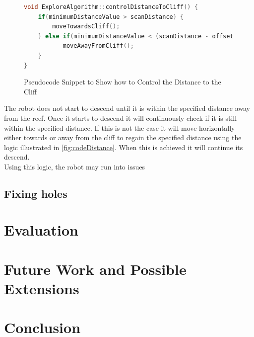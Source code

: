 \documentclass[twoside, 12pt]{article}
\begin{document}
\begin{figure}
\vspace{12pt}
\begin{lstlisting}[language=C++]
void ExploreAlgorithm::controlDistanceToCliff() {
    if(minimumDistanceValue > scanDistance) {
        moveTowardsCliff(); 
    } else if(minimumDistanceValue < (scanDistance - offset)) {
    	   moveAwayFromCliff();
    } 
}
\end{lstlisting} 
\vspace{-38pt}
  \caption{Pseudocode Snippet to Show how to Control the Distance to the Cliff}
  \label{fig:codeDistance}
  \vspace{20pt}
\end{figure}

\begin{figure}
\vspace{-50pt}
\end{figure}

The robot does not start to descend until it is within the specified distance away from the reef. Once it starts to descend it will continuously check if it is still within the specified distance. If this is not the case it will move horizontally either towards or away from the cliff to regain the specified distance using the logic illustrated in \autoref{fig:codeDistance}. When this is achieved it will continue its descend.\\

Using this logic, the robot may run into issues

\newpage

\subsection{Fixing holes}

\section{Evaluation}
\label{sec:eval}


\section{Future Work and Possible Extensions}


\section{Conclusion}
\label{sec:conclusion}

\newpage

{}

\end{document}
